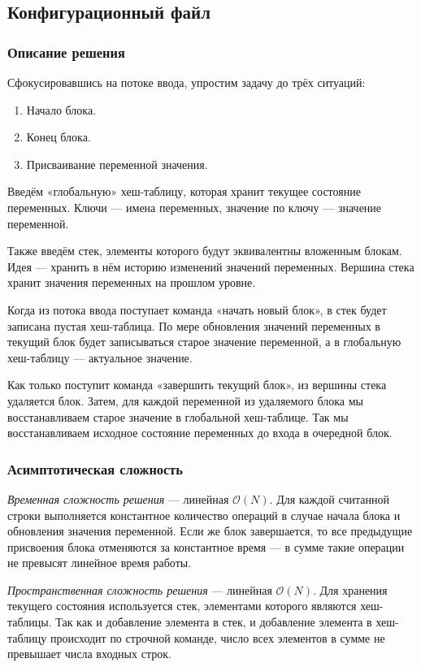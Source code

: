 \subsection{Конфигурационный файл}

\subsubsection{Описание решения}

Сфокусировавшись на потоке ввода, упростим задачу до трёх ситуаций:
%
\begin{enumerate}
  \item Начало блока.
  \item Конец блока.
  \item Присваивание переменной значения.
\end{enumerate}

Введём «глобальную» хеш-таблицу, которая хранит текущее состояние переменных. Ключи --- имена переменных, значение по ключу --- значение переменной.

Также введём стек, элементы которого будут эквивалентны вложенным блокам. Идея --- хранить в нём историю изменений значений переменных. Вершина стека хранит значения переменных на прошлом уровне.

Когда из потока ввода поступает команда «начать новый блок», в стек будет записана пустая хеш-таблица. По мере обновления значений переменных в текущий блок будет записываться старое значение переменной, а в глобальную хеш-таблицу --- актуальное значение.

Как только поступит команда «завершить текущий блок», из вершины стека удаляется блок. Затем, для каждой переменной из удаляемого блока мы восстанавливаем старое значение в глобальной хеш-таблице. Так мы восстанавливаем исходное состояние переменных до входа в очередной блок.

\subsubsection{Асимптотическая сложность}

\textit{Временная сложность решения} --- линейная \( \mathcal{O}(N) \). Для каждой считанной строки выполняется константное количество операций в случае начала блока и обновления значения переменной. Если же блок завершается, то все предыдущие присвоения блока отменяются за константное время --- в сумме такие операции не превысят линейное время работы.

\textit{Пространственная сложность решения} --- линейная \( \mathcal{O}(N) \). Для хранения текущего состояния используется стек, элементами которого являются хеш-таблицы. Так как и добавление элемента в стек, и добавление элемента в хеш-таблицу происходит по строчной команде, число всех элементов в сумме не превышает числа входных строк.

